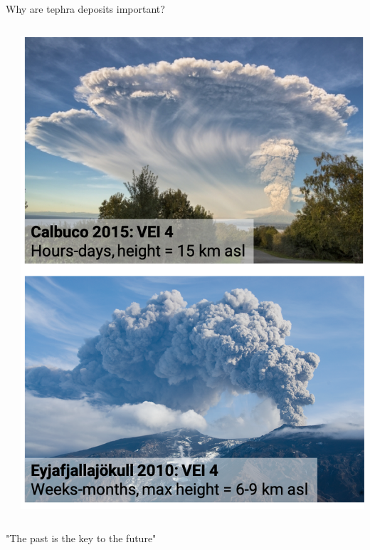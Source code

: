 \documentclass[10pt,aspectratio=169]{beamer}
\begin{document}
\begin{frame}[t]{Why are tephra deposits important?}
{\begin{columns}[T]
\begin{column}{0.6\textwidth}
      \end{column}
      \begin{column}{0.4\textwidth}	
        \includegraphics[width=.9\textwidth]{img/calbuco-eyja.png}
      \end{column}
    \end{columns}
  }
\end{frame}

\begin{frame}[standout]
  "The \alert{past} is the key to the \alert{future}"
\end{frame}
\end{document}
